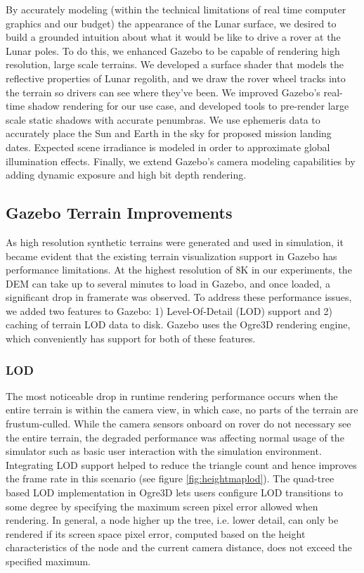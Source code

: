 \documentclass[twocolumn,letterpaper]{IEEEAerospaceCLS}  %
\begin{document}
By accurately modeling (within the technical limitations of real time computer graphics and our budget) the appearance of the Lunar surface, we desired to build a grounded intuition about what it would be like to drive a rover at the Lunar poles. 
To do this, we enhanced Gazebo to be capable of rendering high resolution, large scale terrains. 
We developed a surface shader that models the reflective properties of Lunar regolith, and we draw the rover wheel tracks into the terrain so drivers can see where they've been. 
We improved Gazebo's real-time shadow rendering for our use case, and developed tools to pre-render large scale static shadows with accurate penumbras. 
We use ephemeris data to accurately place the Sun and Earth in the sky for proposed mission landing dates. 
Expected scene irradiance is modeled in order to approximate global illumination effects.   
Finally, we extend Gazebo's camera modeling capabilities by adding dynamic exposure and high bit depth rendering. 

\subsection{Gazebo Terrain Improvements}

As high resolution synthetic terrains were generated and used in simulation, it became evident that the existing terrain visualization support in Gazebo has performance limitations. 
At the highest resolution of 8K in our experiments, the DEM can take up to several minutes to load in Gazebo, and once loaded, a significant drop in framerate was observed. 
To address these performance issues, we added two features to Gazebo: 1) Level-Of-Detail (LOD) support and 2) caching of terrain LOD data to disk.
Gazebo uses the Ogre3D rendering engine, which conveniently has support for both of these features. 

\subsubsection{LOD}

The most noticeable drop in runtime rendering performance occurs when the entire terrain is within the camera view, in which case, no parts of the terrain are frustum-culled. 
While the camera sensors onboard on rover do not necessary see the entire terrain, the degraded performance was affecting normal usage of the simulator such as basic user interaction with the simulation environment. 
Integrating LOD support helped to reduce the triangle count and hence improves the frame rate in this scenario (see figure \ref{fig:heightmaplod}). 
The quad-tree based LOD implementation in Ogre3D lets users configure LOD transitions to some degree by specifying the maximum screen pixel error allowed when rendering. 
In general, a node higher up the tree, i.e. lower detail, can only be rendered if its screen space pixel error, computed based on the height characteristics of the node and the current camera distance, does not exceed the specified maximum. 
\end{document}
